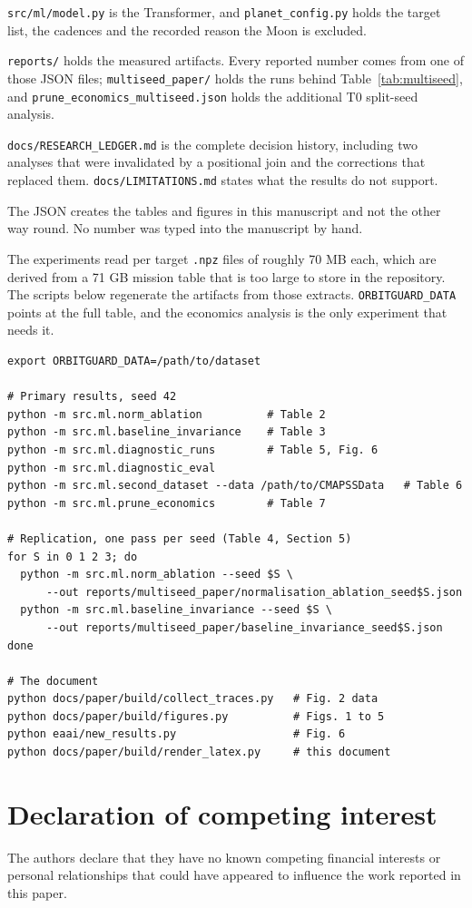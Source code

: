 \documentclass[preprint,12pt,authoryear]{elsarticle}
\begin{document}
\texttt{src/ml/model.py} is the Transformer, and \texttt{planet\_config.py} holds the target list, the cadences and the recorded reason the Moon is excluded.

\texttt{reports/} holds the measured artifacts. Every reported number comes from one of those JSON files; \texttt{multiseed\_paper/} holds the runs behind Table~\ref{tab:multiseed}, and \texttt{prune\_economics\_multiseed.json} holds the additional T0 split-seed analysis.

\texttt{docs/RESEARCH\_LEDGER.md} is the complete decision history, including two analyses that were invalidated by a positional join and the corrections that replaced them. \texttt{docs/LIMITATIONS.md} states what the results do not support.

The JSON creates the tables and figures in this manuscript and not the other way round. No number was typed into the manuscript by hand.

The experiments read per target \texttt{.npz} files of roughly 70 MB each, which are derived from a 71 GB mission table that is too large to store in the repository. The scripts below regenerate the artifacts from those extracts. \texttt{ORBITGUARD\_DATA} points at the full table, and the economics analysis is the only experiment that needs it.

{\scriptsize
\begin{verbatim}
export ORBITGUARD_DATA=/path/to/dataset

# Primary results, seed 42
python -m src.ml.norm_ablation          # Table 2
python -m src.ml.baseline_invariance    # Table 3
python -m src.ml.diagnostic_runs        # Table 5, Fig. 6
python -m src.ml.diagnostic_eval
python -m src.ml.second_dataset --data /path/to/CMAPSSData   # Table 6
python -m src.ml.prune_economics        # Table 7

# Replication, one pass per seed (Table 4, Section 5)
for S in 0 1 2 3; do
  python -m src.ml.norm_ablation --seed $S \
      --out reports/multiseed_paper/normalisation_ablation_seed$S.json
  python -m src.ml.baseline_invariance --seed $S \
      --out reports/multiseed_paper/baseline_invariance_seed$S.json
done

# The document
python docs/paper/build/collect_traces.py   # Fig. 2 data
python docs/paper/build/figures.py          # Figs. 1 to 5
python eaai/new_results.py                  # Fig. 6
python docs/paper/build/render_latex.py     # this document
\end{verbatim}
}

\section*{Declaration of competing interest}
The authors declare that they have no known competing financial interests or personal relationships that could have appeared to influence the work reported in this paper.
\end{document}
